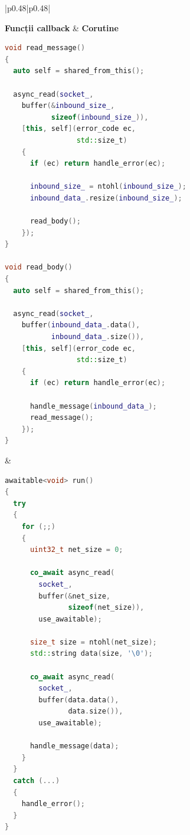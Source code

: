 \begin{table}[t]
\centering
\renewcommand{\arraystretch}{1.1}
\setlength{\tabcolsep}{4pt}

\begin{tabular}{|p{}|p{}|}
\hline

\textbf{Funcții callback} & \textbf{Corutine} \\
\hline

{\scriptsize
\begin{lstlisting}[language=C++]
void read_message()
{
  auto self = shared_from_this();

  async_read(socket_,
    buffer(&inbound_size_,
           sizeof(inbound_size_)),
    [this, self](error_code ec,
                 std::size_t)
    {
      if (ec) return handle_error(ec);

      inbound_size_ = ntohl(inbound_size_);
      inbound_data_.resize(inbound_size_);

      read_body();
    });
}

void read_body()
{
  auto self = shared_from_this();

  async_read(socket_,
    buffer(inbound_data_.data(),
           inbound_data_.size()),
    [this, self](error_code ec,
                 std::size_t)
    {
      if (ec) return handle_error(ec);

      handle_message(inbound_data_);
      read_message();
    });
}
\end{lstlisting}
}
&
{\scriptsize
\begin{lstlisting}[language=C++]
awaitable<void> run()
{
  try
  {
    for (;;)
    {
      uint32_t net_size = 0;

      co_await async_read(
        socket_,
        buffer(&net_size,
               sizeof(net_size)),
        use_awaitable);

      size_t size = ntohl(net_size);
      std::string data(size, '\0');

      co_await async_read(
        socket_,
        buffer(data.data(),
               data.size()),
        use_awaitable);

      handle_message(data);
    }
  }
  catch (...)
  {
    handle_error();
  }
}
\end{lstlisting}
}
\\ \hline

\end{tabular}

\caption{Boost ASIO cu funcții callback vs. corutine din C++20}
\label{tab:asio_comparison}
\end{table}

